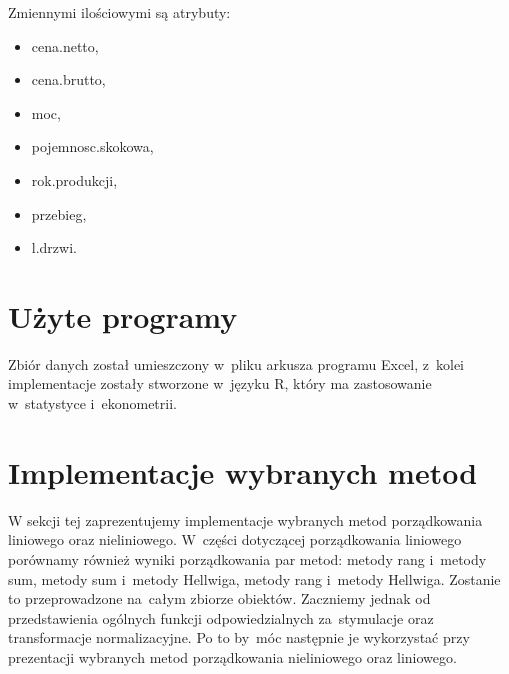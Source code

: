 \documentclass[12pt,a4paper]{report}
\begin{document}
Zmiennymi ilościowymi są atrybuty:
\begin{multicols}{3}
\begin{itemize}
 \item cena.netto,%
 \item cena.brutto,%
 \item moc,%
 \item pojemnosc.skokowa,%
 \item rok.produkcji, %
 \item przebieg,%
 \item l.drzwi. %
\end{itemize}
\end{multicols}

%

\section{Użyte programy}
Zbiór danych został umieszczony w~pliku arkusza programu Excel, z~kolei implementacje zostały stworzone w~języku R, który ma zastosowanie w~statystyce i~ekonometrii. 


\section{Implementacje wybranych metod}
W sekcji tej zaprezentujemy implementacje wybranych metod porządkowania liniowego oraz nieliniowego. W~części dotyczącej porządkowania liniowego porównamy również wyniki porządkowania par metod: metody rang i~metody sum, metody sum i~metody Hellwiga, metody rang i~metody Hellwiga. Zostanie to przeprowadzone na~całym zbiorze obiektów. 
Zaczniemy jednak od przedstawienia ogólnych funkcji odpowiedzialnych za~stymulacje oraz transformacje normalizacyjne. Po to by~móc następnie je wykorzystać przy prezentacji wybranych metod porządkowania nieliniowego oraz liniowego. 
\end{document}
